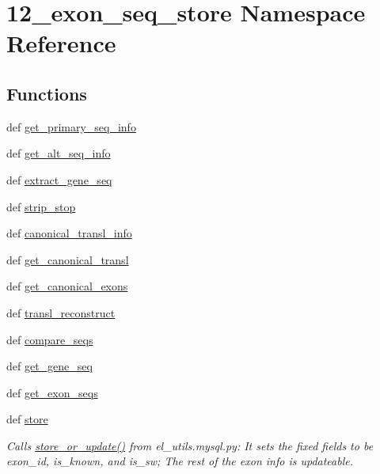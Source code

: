 \hypertarget{namespace12__exon__seq__store}{\section{12\-\_\-exon\-\_\-seq\-\_\-store Namespace Reference}
\label{namespace12__exon__seq__store}
}
\subsection*{Functions}
\begin{DoxyCompactItemize}
\item 
def \hyperlink{namespace12__exon__seq__store_aa683a56ce5b02b6140dcff8940a5fd7e}{get\-\_\-primary\-\_\-seq\-\_\-info}
\item 
def \hyperlink{namespace12__exon__seq__store_a7e07147d33945c4af6b7ad2abaf3cd85}{get\-\_\-alt\-\_\-seq\-\_\-info}
\item 
def \hyperlink{namespace12__exon__seq__store_a6e2645c20b8ecb2f7644276caa025214}{extract\-\_\-gene\-\_\-seq}
\item 
def \hyperlink{namespace12__exon__seq__store_aba2efa8f46ef665d66b5f51a0deac1a0}{strip\-\_\-stop}
\item 
def \hyperlink{namespace12__exon__seq__store_a0b65b4fd52a3291d2086528cc1f47858}{canonical\-\_\-transl\-\_\-info}
\item 
def \hyperlink{namespace12__exon__seq__store_acf44dc16c6b297ff8db54e486dfd0fba}{get\-\_\-canonical\-\_\-transl}
\item 
def \hyperlink{namespace12__exon__seq__store_a9573a058a9f0bde8a68724ce31cc3093}{get\-\_\-canonical\-\_\-exons}
\item 
def \hyperlink{namespace12__exon__seq__store_a163f10dd9974fa59e5dcb0702b722de6}{transl\-\_\-reconstruct}
\item 
def \hyperlink{namespace12__exon__seq__store_acf9f17f2aa3d0f54e3662c145a606a32}{compare\-\_\-seqs}
\item 
def \hyperlink{namespace12__exon__seq__store_a0a266b0c76b80904008c1ac963e9d8d4}{get\-\_\-gene\-\_\-seq}
\item 
def \hyperlink{namespace12__exon__seq__store_abf226158714d028315bb8905415f81f7}{get\-\_\-exon\-\_\-seqs}
\item 
def \hyperlink{namespace12__exon__seq__store_a6c9dc3a2f058425a6a487fc8b868d658}{store}
\begin{DoxyCompactList}\small\item\em Calls \hyperlink{namespaceel__utils_1_1mysql_ad1dbce5e2a628225a3aee9f4bb002d4b}{store\-\_\-or\-\_\-update()} from el\-\_\-utils.\-mysql.\-py\-: It sets the fixed fields to be exon\-\_\-id, is\-\_\-known, and is\-\_\-sw; The rest of the exon info is updateable. \end{DoxyCompactList}\item 

\end{DoxyCompactItemize}
